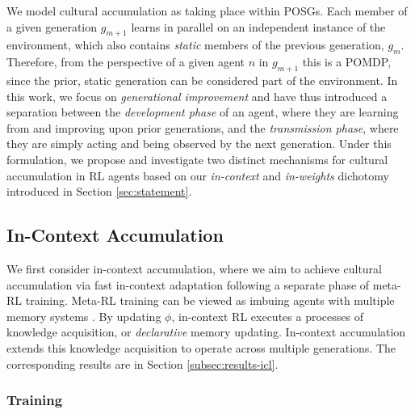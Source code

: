 \documentclass{article}
\begin{document}
We model cultural accumulation as taking place within POSGs. Each member of a given generation $g_{m+1}$ learns in parallel on an independent instance of the environment, which also contains \textit{static} members of the previous generation, $g_m$. Therefore, from the perspective of a given agent $n$ in $g_{m+1}$ this is a POMDP, since the prior, static generation can be considered part of the environment.
In this work, we focus on \textit{generational improvement} and have thus introduced a separation between the \textit{development phase} of an agent, where they are learning from and improving upon prior generations, and the \textit{transmission phase}, where they are simply acting and being observed by the next generation. Under this formulation, we propose and investigate two distinct mechanisms for cultural accumulation in RL agents based on our \textit{in-context} and \textit{in-weights} dichotomy introduced in Section \ref{sec:statement}. 

\subsection{In-Context Accumulation}

We first consider in-context accumulation, where we aim to achieve cultural accumulation via fast in-context adaptation following a separate phase of meta-RL training. Meta-RL training can be viewed as imbuing agents with multiple memory systems \citep{squire1993structure}. By updating $\phi$, in-context RL executes a processes of knowledge acquisition, or \textit{declarative} memory \citep{squire2004memory} updating. In-context accumulation extends this knowledge acquisition to operate across multiple generations. The corresponding results are in Section \ref{subsec:results-icl}.


\subsubsection{Training}
\end{document}
